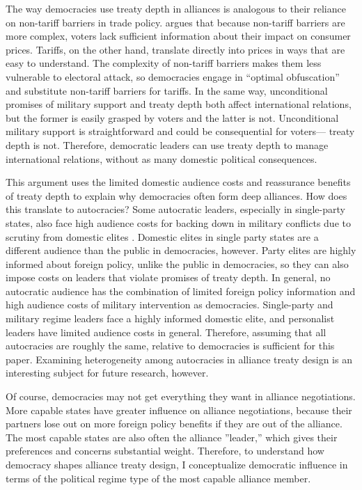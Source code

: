 \documentclass[12pt]{article}
\begin{document}
The way democracies use treaty depth in alliances is analogous to their reliance on non-tariff barriers in trade policy.
\citet{Kono2006} argues that because non-tariff barriers are more complex, voters lack sufficient information about their impact on consumer prices.
Tariffs, on the other hand, translate directly into prices in ways that are easy to understand.
The complexity of non-tariff barriers makes them less vulnerable to electoral attack, so democracies engage in ``optimal obfuscation'' and substitute non-tariff barriers for tariffs. 
In the same way, unconditional promises of military support and treaty depth both affect international relations, but the former is easily grasped by voters and the latter is not. 
Unconditional military support is straightforward and could be consequential for voters--- treaty depth is not. 
Therefore, democratic leaders can use treaty depth to manage international relations, without as many domestic political consequences.



This argument uses the limited domestic audience costs and reassurance benefits of treaty depth to explain why democracies often form deep alliances. 
How does this translate to autocracies? 
Some autocratic leaders, especially in single-party states, also face high audience costs for backing down in military conflicts due to scrutiny from domestic elites \citep{Weeks2014}.
Domestic elites in single party states are a different audience than the public in democracies, however.  
Party elites are highly informed about foreign policy, unlike the public in democracies, so they can also impose costs on leaders that violate promises of treaty depth. 
In general, no autocratic audience has the combination of limited foreign policy information and high audience costs of military intervention as democracies.
Single-party and military regime leaders face a highly informed domestic elite, and personalist leaders have limited audience costs in general. 
Therefore, assuming that all autocracies are roughly the same, relative to democracies is sufficient for this paper. 
Examining heterogeneity among autocracies in alliance treaty design is an interesting subject for future research, however. 


Of course, democracies may not get everything they want in alliance negotiations. 
More capable states have greater influence on alliance negotiations, because their partners lose out on more foreign policy benefits if they are out of the alliance.
The most capable states are also often the alliance ''leader,'' which gives their preferences and concerns substantial weight. 
Therefore, to understand how democracy shapes alliance treaty design, I conceptualize democratic influence in terms of the political regime type of the most capable alliance member. 
\end{document}
